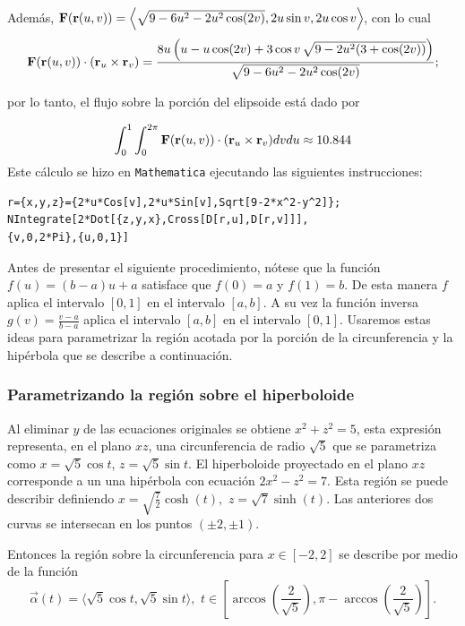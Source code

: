 \begin{parrafonumerado}
Además,
${\bf F}({\bf r}(u,v) ) = \left \langle \sqrt{9-6u^2-2u^2 \cos(2v)},2u \sin v , 2u\cos v \right\rangle \!$,
con lo cual
{\small
\[{\bf F}({\bf r}(u,v) ) \cdot ({\bf r}_u \times {\bf r}_v)=\frac{ 8u \left (u-u \cos (2v) +3 \cos v \, \sqrt{9-2u^2(3+\cos(2v))}\right )}{\sqrt{9-6u^2-2u^2 \cos(2v)}};\]
}

por lo tanto, el flujo sobre la porción del elipsoide está dado por

\begin{equation} \label{ejercicio6e}
\int_0^1 \int_0^{2\pi} {\bf F}({\bf r}(u,v) ) \cdot ({\bf r}_u \times {\bf r}_v) dvdu \approx 10.844
\end{equation}
Este cálculo se hizo en \verb"Mathematica" ejecutando las siguientes instrucciones:

\begin{tcolorbox}[title=\bf Instrucción \verb"Mathematica"]\begin{Verbatim}[formatcom=\letraverbatim]
r={x,y,z}={2*u*Cos[v],2*u*Sin[v],Sqrt[9-2*x^2-y^2]};
NIntegrate[2*Dot[{z,y,x},Cross[D[r,u],D[r,v]]],
{v,0,2*Pi},{u,0,1}]
\end{Verbatim}
\end{tcolorbox}

Antes de presentar el siguiente procedimiento, nótese que la función $f(u)= (b-a)u+a$ satisface que $f(0)=a$ y $f(1)=b$.
De esta manera $f$ aplica el intervalo $[0,1]$ en el intervalo $[a,b]$. A su vez la función inversa
$g(v)= \frac{v-a}{b-a}$ aplica el intervalo $[a,b]$ en el intervalo $[0,1]$.
Usaremos estas ideas para parametrizar la región acotada por la porción de la circunferencia y la hipérbola que se des\-cribe a continuación.

\subsubsection{Parametrizando la región sobre el hiperboloide}

Al eliminar $y$ de las ecuaciones originales se obtiene $x^2+z^2=5$,
esta expresión representa, en el plano $xz$, una circunferencia de radio $\sqrt{5}$ que se parametriza como
$x=\sqrt{5}\cos t$, $z=\sqrt{5}\sin t$.
El hiperboloide proyectado en el plano $xz$ corresponde a un una hipérbola con ecuación $2x^2-z^2=7$.
Esta región se puede describir definiendo $x=\sqrt{\frac{7}{2}}\cosh (t),\,\, z=\sqrt{7}\sinh (t)$.
Las anteriores dos curvas se intersecan en los puntos $(\pm 2, \pm 1)$.

Entonces la región sobre la circunferencia para $x\in [-2,2]$ se describe por medio de la función
\[\overrightarrow{\alpha}(t)=\langle \sqrt{5}\cos t, \sqrt{5}\sin t \rangle, \,\,
t \in \left[ \arccos \left( \frac{2}{\sqrt{5}}\right),\pi -\arccos \left( \frac{2}{\sqrt{5}}\right) \right].\]


\end{parrafonumerado}
